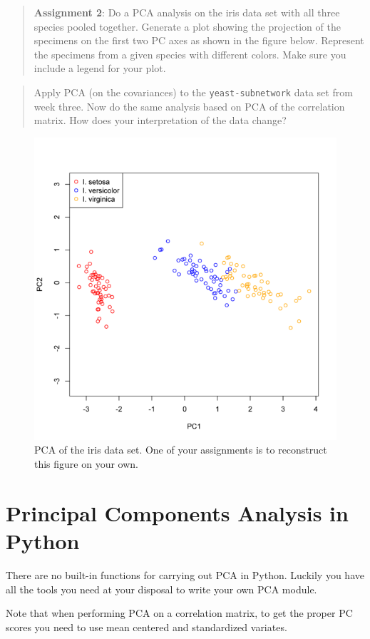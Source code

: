\begin{quote}
\textbf{Assignment 2}: Do a PCA analysis on the iris data set with all
three species pooled together. Generate a plot showing the projection of
the specimens on the first two PC axes as shown in the figure below.
Represent the specimens from a given species with different colors. Make
sure you include a legend for your plot.

\end{quote}
\begin{quote}
Apply PCA (on the covariances) to the \lstinline!yeast-subnetwork! data
set from week three. Now do the same analysis based on PCA of the
correlation matrix. How does your interpretation of the data change?

\end{quote}
\begin{figure}[htbp]
\centering
\includegraphics[width=0.8\columnwidth]{iris-all-pca.png}
\caption{PCA of the iris data set. One of your assignments is to
reconstruct this figure on your own.}
\end{figure}

\section{Principal Components Analysis in Python}

There are no built-in functions for carrying out PCA in Python. Luckily
you have all the tools you need at your disposal to write your own PCA
module.

Note that when performing PCA on a correlation matrix, to get the proper
PC scores you need to use mean centered and standardized variates.

